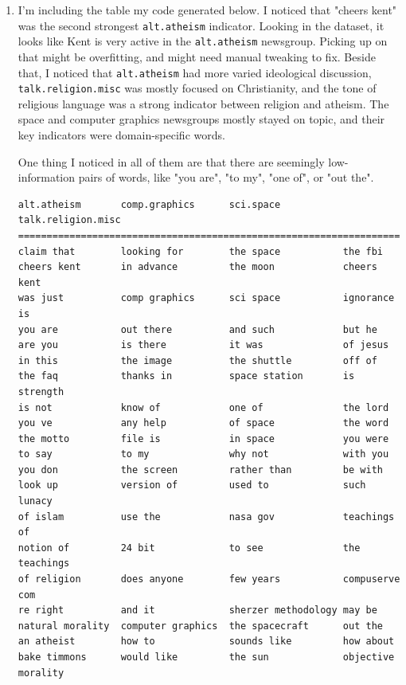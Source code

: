 \documentclass{article}
\begin{document}
\begin{enumerate}[start=1]
\newpage

\item %
    I'm including the table my code generated below. I noticed that "cheers kent" was the second strongest \texttt{alt.atheism} indicator. Looking in the dataset, it looks like Kent is very active in the \texttt{alt.atheism} newsgroup. Picking up on that might be overfitting, and might need manual tweaking to fix. Beside that, I noticed that \texttt{alt.atheism} had more varied ideological discussion, \texttt{talk.religion.misc} was mostly focused on Christianity, and the tone of religious language was a strong indicator between religion and atheism. The space and computer graphics newsgroups mostly stayed on topic, and their key indicators were domain-specific words.

    One thing I noticed in all of them are that there are seemingly low-information pairs of words, like "you are", "to my", "one of", or "out the".
    
    \begin{Verbatim}
alt.atheism       comp.graphics      sci.space           talk.religion.misc  
===========================================================================
claim that        looking for        the space           the fbi             
cheers kent       in advance         the moon            cheers kent         
was just          comp graphics      sci space           ignorance is        
you are           out there          and such            but he              
are you           is there           it was              of jesus            
in this           the image          the shuttle         off of              
the faq           thanks in          space station       is strength         
is not            know of            one of              the lord            
you ve            any help           of space            the word            
the motto         file is            in space            you were            
to say            to my              why not             with you            
you don           the screen         rather than         be with             
look up           version of         used to             such lunacy         
of islam          use the            nasa gov            teachings of        
notion of         24 bit             to see              the teachings       
of religion       does anyone        few years           compuserve com      
re right          and it             sherzer methodology may be              
natural morality  computer graphics  the spacecraft      out the             
an atheist        how to             sounds like         how about           
bake timmons      would like         the sun             objective morality  
    \end{Verbatim}


\end{enumerate}
\end{document}
